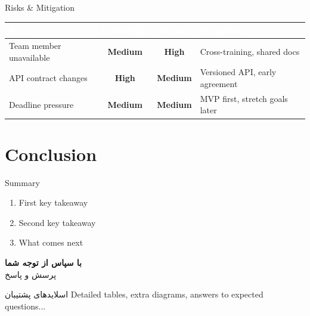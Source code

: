 \documentclass[
	11pt,              %
	aspectratio=169,   %
]{beamer}
\newcommand{\txtQuestions}{پرسش و پاسخ}
\newcommand{\txtThanks}{با سپاس از توجه شما}
\newcommand{\txtBackup}{اسلایدهای پشتیبان}
\newcommand{\txtQuestions}{Questions?}
\newcommand{\txtThanks}{Thank you for your attention}
\newcommand{\txtBackup}{Backup Slides}
\newcommand{\high}[1]{\textcolor{lvlhigh}{\textbf{#1}}}
\newcommand{\med}[1]{\textcolor{lvlmed}{\textbf{#1}}}
\newcommand{\backupbegin}{\newcounter{finalframe}\setcounter{finalframe}{\value{framenumber}}}
\newcommand{\backupend}{\setcounter{framenumber}{\value{finalframe}}}
\begin{document}
\begin{frame}{Risks \& Mitigation}
	\begin{tabularx}{\linewidth}{L c c L}
		\toprule
		\textcolor{white}{\textbf{Risk}} &
		\textcolor{white}{\textbf{Probability}} &
		\textcolor{white}{\textbf{Impact}} &
		\textcolor{white}{\textbf{Mitigation}} \\
		\midrule
		Team member unavailable  & \med{Medium} & \high{High}  & Cross-training, shared docs \\
		API contract changes     & \high{High}  & \med{Medium} & Versioned API, early agreement \\
		Deadline pressure        & \med{Medium} & \med{Medium} & MVP first, stretch goals later \\
		\bottomrule
	\end{tabularx}
\end{frame}

\section{Conclusion}

\begin{frame}{Summary}
	\begin{enumerate}
		\item First key takeaway
		\item Second key takeaway
		\item What comes next
	\end{enumerate}
\end{frame}

\begin{frame}
	\centering
	\vfill
	{\Huge\bfseries\color{brand} \txtThanks}\\[1em]
	{\Large\color{accent} \txtQuestions}
	\vfill
\end{frame}

\appendix
\backupbegin

\begin{frame}{\txtBackup}
	Detailed tables, extra diagrams, answers to expected questions...
\end{frame}

\backupend
\end{document}
